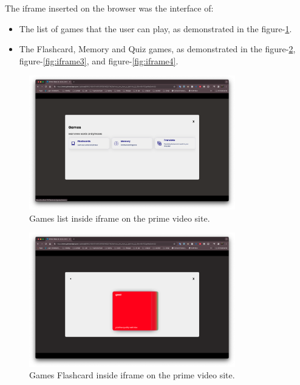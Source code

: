 \documentclass[12pt]{article}
\begin{document}
    The iframe inserted on the browser was the interface of:

    \begin{itemize}
    \item The list of games that the user can play, as demonstrated in the figure-\ref{fig:iframe1}.
    \item The Flashcard, Memory and Quiz games, as demonstrated in the figure-\ref{fig:iframe2}, figure-\ref{fig:iframe3}, and figure-\ref{fig:iframe4}.
    \end{itemize}


    \begin{figure}
      \centering
      \caption{
      Games list inside iframe on the prime video site.
      }
      \label{fig:iframe1}
      \includegraphics[width=0.8\textwidth]{assets/9.png}
    \end{figure}

    \begin{figure}
      \centering
      \caption{
      Games Flashcard inside iframe on the prime video site.
      }
      \label{fig:iframe2}
      \includegraphics[width=0.8\textwidth]{assets/10.png}
    \end{figure}
\end{document}
